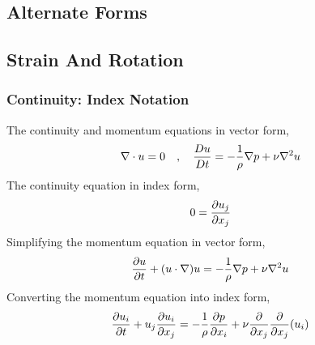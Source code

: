\documentclass[a4paper, 12pt]{report}
\begin{document}
\begin{center}
\section{Alternate Forms}
\subsection{Strain And Rotation}
\begin{comment}
\end{comment}
\subsubsection{Continuity: Index Notation}
\begin{comment}
\end{comment}
The continuity and momentum equations in vector form,
$$\nabla\cdot u=0 \quad,\quad \frac{Du}{Dt} = -\frac{1}{\rho}\nabla p + \nu\nabla^2 u$$
The continuity equation in index form,
$$0 = \frac{\partial u_j}{\partial x_j}$$
Simplifying the momentum equation in vector form,
$$\frac{\partial u}{\partial t} + (u\cdot\nabla)u = -\frac{1}{\rho}\nabla p + \nu\nabla^2 u$$
Converting the momentum equation into index form,
$$\frac{\partial u_i}{\partial t} + u_j\frac{\partial u_i}{\partial x_j} = -\frac{1}{\rho}\frac{\partial p}{\partial x_i} + \nu\frac{\partial}{\partial x_j}\frac{\partial}{\partial x_j}(u_i)$$

\end{center}
\end{document}
